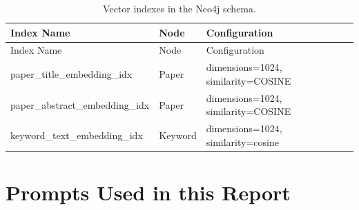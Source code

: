 {
\begin{longtable}{@{}p{5.5cm}p{1.5cm}p{4.8cm}@{}}
\caption{Vector indexes in the Neo4j schema.}
\label{tab:indexes-vector} \\

\toprule
{\raggedright Index Name\par} & Node & {\raggedright Configuration\par} \\
\midrule
\endfirsthead

\toprule
{\raggedright Index Name\par} & Node & {\raggedright Configuration\par} \\
\midrule
\endhead

\bottomrule
\endfoot

{\raggedright paper\_\allowbreak title\_\allowbreak embedding\_\allowbreak idx\par} & Paper &
{\raggedright dimensions=1024, similarity=COSINE\par} \\

{\raggedright paper\_\allowbreak abstract\_\allowbreak embedding\_\allowbreak idx\par} & Paper &
{\raggedright dimensions=1024, similarity=COSINE\par} \\

{\raggedright keyword\_\allowbreak text\_\allowbreak embedding\_\allowbreak idx\par} & Keyword &
{\raggedright dimensions=1024, similarity=cosine\par} \\

\end{longtable}
}

\section{Prompts Used in this Report}

